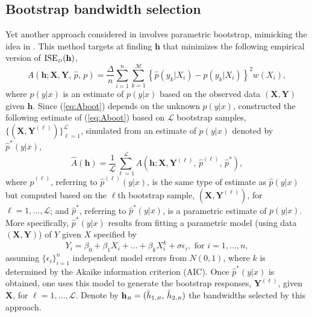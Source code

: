 \documentclass[fleqn,12pt,twoside]{article}
\newcommand{\calL}{\mathcal{L}}
\newcommand{\calM}{\mathcal{M}}
\newcommand{\ISE}{\mathrm{ISE}}
\newcommand{\bh}{\mathbf{h}}
\newcommand{\bX}{\mathbf{X}}
\newcommand{\bY}{\mathbf{Y}}
\numberwithin{equation}{section}
\begin{document}
\subsection{Bootstrap bandwidth selection}
Yet another approach considered in \cite{Bashtannyk.Hyndman2001} involves parametric bootstrap, mimicking the idea in \cite{Hall1999}. This method targets at finding $\bh$ that minimizes the following empirical version of $\ISE_{\hbox {\tiny $D$}}(\bh)$,
\begin{equation}
A(\bh; \bX, \bY, \,\hat{p}, \,p) = \frac{\Delta}{n} \sum_{i=1}^{n} \sum_{k=1}^{\calM} \left\{ \hat{p}(y_k|X_i)-p(y_k|X_i) \right\}^2w(X_i),
\label{eq:Aboot}
\end{equation}
where $\hat{p}(y|x)$ is an estimate of $p(y|x)$ based on the observed data $(\bX, \bY)$ given $\bh$. Since (\ref{eq:Aboot}) depends on the unknown $p(y|x)$, \cite{Bashtannyk.Hyndman2001} constructed the following estimate of (\ref{eq:Aboot}) based on $\calL$ bootstrap samples, $\{(\bX,\bY^{(\ell)})\}_{\ell=1}^\calL$, simulated from an estimate of $p(y|x)$ denoted by $\hat p^*(y|x)$, 
\begin{equation}\label{bootstrap}
\hat A(\bh) = \frac{1}{\calL} \sum_{\ell=1}^{\calL} A(\bh; \bX, \bY^{(\ell)}, \,\hat{p}^{(\ell)}, \,\hat p^*),
\end{equation}
where $\hat{p}^{(\ell)}$, referring to $\hat p^{(\ell)}(y|x)$, is the same type of estimate as $\hat{p}(y|x)$ but computed based on the $\ell$th bootstrap sample, $(\bX,\bY^{(\ell)})$, for $\ell=1, \ldots, \calL$; and $\hat p^*$, referring to $\hat p^*(y|x)$, is a parametric estimate of $p(y|x)$. More specifically, $\hat p^*(y|x)$ results from fitting a parametric model (using data $(\bX, \bY)$) of $Y$ given $X$ specified by 
\[ Y_i=\beta_0 +\beta_1X_i + \ldots + \beta_kX_i^k + \sigma\epsilon_i, \textrm{ for $i=1, \ldots, n$},
\]
assuming $\{\epsilon_i\}_{i=1}^n$ independent model errors from $N(0, 1)$, where $k$ is determined by the Akaike information criterion (AIC). Once $\hat{p}^*(y|x)$ is obtained, one uses this model to generate the bootstrap responses, $\bY^{(\ell)}$, given $\bX$, for $\ell=1,\ldots, \calL$. Denote by $\bh_{\hbox {\tiny $B$}}=(\hat{h}_{1, \hbox {\tiny $B$}}, \, \hat{h}_{2, \hbox {\tiny $B$}})$ the bandwidths selected by this approach. 
\end{document}
